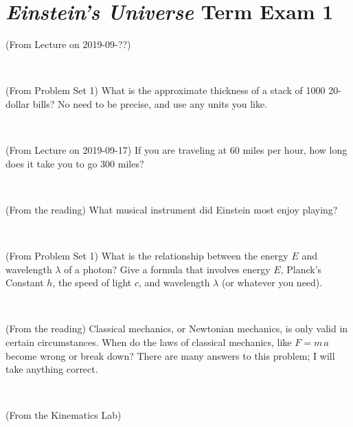 \documentclass[12pt, letterpaper]{article}
\begin{document}
\section*{\textsl{Einstein's Universe} Term Exam 1}
\setcounter{problem}{1}


\begin{problem} (From Lecture on 2019-09-??)
\end{problem}


\vfill ~

\begin{problem} (From Problem Set 1)
What is the approximate thickness of a stack of 1000 20-dollar bills?
No need to be precise, and use any units you like.
\end{problem}


\vfill ~

\begin{problem} (From Lecture on 2019-09-17)
If you are traveling at 60 miles per hour, how long does
it take you to go 300 miles?
\end{problem}


\vfill ~

\begin{problem} (From the reading)
What musical instrument did Einstein most enjoy playing?
\end{problem}


\vfill ~


\clearpage


\begin{problem} (From Problem Set 1)
What is the relationship between the energy $E$ and wavelength
$\lambda$ of a photon? Give a formula that involves energy $E$,
Planck's Constant $h$, the speed of light $c$, and wavelength
$\lambda$ (or whatever you need).
\end{problem}

\vfill ~

\begin{problem} (From the reading)
Classical mechanics, or Newtonian mechanics, is only valid in certain
circumstances. When do the laws of classical mechanics, like $F =
m\,a$ become wrong or break down? There are many answers to this
problem; I will take anything correct.
\end{problem}


\vfill ~

\begin{problem} (From the Kinematics Lab)

\end{problem}
\end{document}
